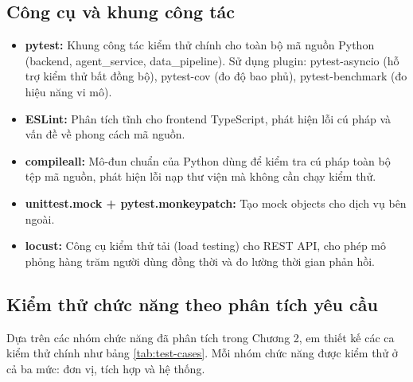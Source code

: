 \subsection{Công cụ và khung công tác}

\begin{itemize}
    \item \textbf{pytest:} Khung công tác kiểm thử chính cho toàn bộ mã nguồn Python (backend, agent\_service, data\_pipeline). Sử dụng plugin: pytest-asyncio (hỗ trợ kiểm thử bất đồng bộ), pytest-cov (đo độ bao phủ), pytest-benchmark (đo hiệu năng vi mô).
    \item \textbf{ESLint:} Phân tích tĩnh cho frontend TypeScript, phát hiện lỗi cú pháp và vấn đề về phong cách mã nguồn.
    \item \textbf{compileall:} Mô-đun chuẩn của Python dùng để kiểm tra cú pháp toàn bộ tệp mã nguồn, phát hiện lỗi nạp thư viện mà không cần chạy kiểm thử.
    \item \textbf{unittest.mock + pytest.monkeypatch:} Tạo mock objects cho dịch vụ bên ngoài.
    \item \textbf{locust:} Công cụ kiểm thử tải (load testing) cho REST API, cho phép mô phỏng hàng trăm người dùng đồng thời và đo lường thời gian phản hồi.
\end{itemize}

\subsection{Kiểm thử chức năng theo phân tích yêu cầu}

Dựa trên các nhóm chức năng đã phân tích trong Chương 2, em thiết kế các ca kiểm thử chính như bảng \ref{tab:test-cases}. Mỗi nhóm chức năng được kiểm thử ở cả ba mức: đơn vị, tích hợp và hệ thống.

